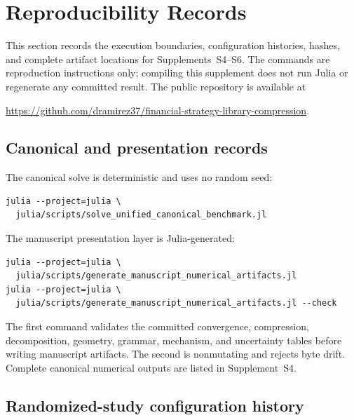 \section{Reproducibility Records}
\label{sec:supp-reproducibility}

This section records the execution boundaries, configuration histories,
hashes, and complete artifact locations for Supplements~S4--S6.  The commands
are reproduction instructions only; compiling this supplement does not run
Julia or regenerate any committed result.  The public repository is available
at
\begin{center}
\url{https://github.com/dramirez37/financial-strategy-library-compression}.
\end{center}

\subsection{Canonical and presentation records}

The canonical solve is deterministic and uses no random seed:
\begin{verbatim}
julia --project=julia \
  julia/scripts/solve_unified_canonical_benchmark.jl
\end{verbatim}
The manuscript presentation layer is Julia-generated:
\begin{verbatim}
julia --project=julia \
  julia/scripts/generate_manuscript_numerical_artifacts.jl
julia --project=julia \
  julia/scripts/generate_manuscript_numerical_artifacts.jl --check
\end{verbatim}
The first command validates the committed convergence, compression,
decomposition, geometry, grammar, mechanism, and uncertainty tables before
writing manuscript artifacts.  The second is nonmutating and rejects byte
drift.  Complete canonical numerical outputs are listed in Supplement~S4.

\subsection{Randomized-study configuration history}

